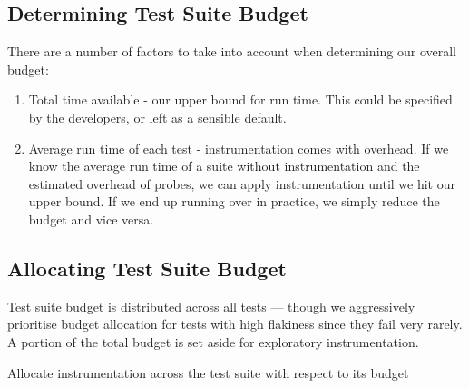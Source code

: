 \subsection{Determining Test Suite Budget}

There are a number of factors to take into account when determining our overall budget:

\begin{enumerate}
	\item Total time available - our upper bound for run time. This could be specified by the developers, or left as a sensible default.
	\item Average run time of each test - instrumentation comes with overhead. If we know the average run time of a suite without instrumentation and the estimated overhead of probes, we can apply instrumentation until we hit our upper bound. If we end up running over in practice, we simply reduce the budget and vice versa.
\end{enumerate}

\subsection{Allocating Test Suite Budget}

Test suite budget is distributed across all tests --- though we aggressively prioritise budget allocation for tests with high flakiness since they fail very rarely. A portion of the total budget is set aside for exploratory instrumentation.


\renewcommand{\algorithmicto}{\textbf{in}}

\begin{algorithm}
\caption{Allocate instrumentation across the test suite with respect to its budget}
\label{alg1}
\begin{algorithmic}
	\ENDWHILE
\end{algorithmic}
\end{algorithm}

